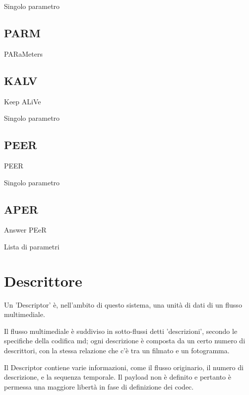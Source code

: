 Singolo parametro






\subsection{PARM}
%

PARaMeters






\subsection{KALV}
%

Keep ALiVe



Singolo parametro






\subsection{PEER}
%

PEER



Singolo parametro






\subsection{APER}
%

Answer PEeR



Lista di parametri






\section{Descrittore}


Un 'Descriptor' è, nell'ambito di questo sistema, una unità di dati di un flusso multimediale.

Il flusso multimediale è suddiviso in sotto-flussi detti 'descrizioni', secondo le specifiche della codifica md; ogni descrizione è composta da un certo numero di descrittori, con la stessa relazione che c'è tra un filmato e un fotogramma.

Il Descriptor contiene varie informazioni, come il flusso originario, il numero di descrizione, e la sequenza temporale. Il payload non è definito e pertanto è permessa una maggiore libertà in fase di definizione dei codec.






